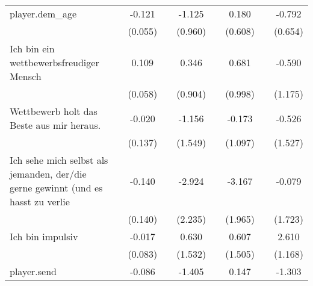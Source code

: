 \begin{table}[htbp]
\begin{tabular}{l*{8}{c}}
player.dem\_age      &                     &      -0.121\sym{*}  &                     &      -1.125         &                     &       0.180         &                     &      -0.792         \\
                    &                     &     (0.055)         &                     &     (0.960)         &                     &     (0.608)         &                     &     (0.654)         \\
Ich bin ein wettbewerbsfreudiger Mensch&                     &       0.109         &                     &       0.346         &                     &       0.681         &                     &      -0.590         \\
                    &                     &     (0.058)         &                     &     (0.904)         &                     &     (0.998)         &                     &     (1.175)         \\
Wettbewerb holt das Beste aus mir heraus.&                     &      -0.020         &                     &      -1.156         &                     &      -0.173         &                     &      -0.526         \\
                    &                     &     (0.137)         &                     &     (1.549)         &                     &     (1.097)         &                     &     (1.527)         \\
Ich sehe mich selbst als jemanden, der/die gerne gewinnt (und es hasst zu verlie&                     &      -0.140         &                     &      -2.924         &                     &      -3.167         &                     &      -0.079         \\
                    &                     &     (0.140)         &                     &     (2.235)         &                     &     (1.965)         &                     &     (1.723)         \\
Ich bin impulsiv    &                     &      -0.017         &                     &       0.630         &                     &       0.607         &                     &       2.610\sym{*}  \\
                    &                     &     (0.083)         &                     &     (1.532)         &                     &     (1.505)         &                     &     (1.168)         \\
player.send         &                     &      -0.086\sym{*}  &                     &      -1.405         &                     &       0.147         &                     &      -1.303\sym{**} \\

\end{tabular}
\end{table}
